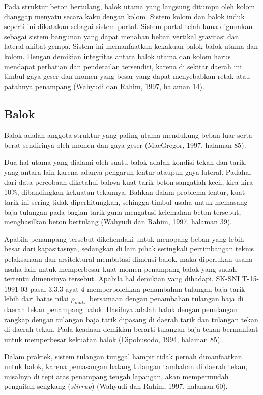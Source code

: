 Pada struktur beton bertulang, balok utama yang langsung ditumpu oleh
kolom dianggap menyatu secara kaku dengan kolom. Sistem kolom dan balok
induk seperti ini dikatakan sebagai sistem portal. Sistem portal telah
lama digunakan sebagai sistem bangunan yang dapat menahan beban vertikal
gravitasi dan lateral akibat gempa. Sistem ini memanfaatkan kekakuan
balok-balok utama dan kolom. Dengan demikian integritas antara balok utama
dan kolom harus mendapat perhatian dan pendetailan tersendiri, karena di
sekitar daerah ini timbul gaya geser dan momen yang besar yang dapat
menyebabkan retak atau patahnya penampang (Wahyudi dan Rahim, 1997,
halaman 14).

\subsection{Balok}

Balok adalah anggota struktur yang paling utama mendukung beban luar serta
berat sendirinya oleh momen dan gaya geser (MacGregor, 1997, halaman 85).

Dua hal utama yang dialami oleh suatu balok adalah kondisi tekan dan
tarik, yang antara lain karena adanya pengaruh lentur ataupun gaya
lateral. Padahal dari data percobaan diketahui bahwa kuat tarik beton
sangatlah kecil, kira-kira 10\%, dibandingkan kekuatan tekannya. Bahkan
dalam problema lentur, kuat tarik ini sering tidak diperhitungkan, sehingga
timbul usaha untuk memasang baja tulangan pada bagian tarik guna mengatasi
kelemahan beton tersebut, menghasilkan beton bertulang (Wahyudi dan Rahim,
1997, halaman 39).

Apabila penampang tersebut dikehendaki untuk menopang beban yang lebih
besar dari kapasitasnya, sedangkan di lain pihak seringkali pertimbangan
teknis pelaksanaan dan arsitektural membatasi dimensi balok, maka
diperlukan usaha-usaha lain untuk memperbesar kuat momen penampang balok
yang sudah tertentu dimensinya tersebut. Apabila hal demikian yang
dihadapi, SK-SNI T-15-1991-03 pasal 3.3.3 ayat 4 memperbolehkan penambahan
tulangan baja tarik lebih dari batas nilai $\rho_{maks}$ bersamaan dengan
penambahan tulangan baja di daerah tekan penampang balok. Hasilnya adalah
balok dengan penulangan rangkap dengan tulangan baja tarik dipasang di
daerah tarik dan tulangan tekan di daerah tekan. Pada keadaan demikian
berarti tulangan baja tekan bermanfaat untuk memperbesar kekuatan balok
(Dipohusodo, 1994, halaman 85).

Dalam praktek, sistem tulangan tunggal hampir tidak pernah dimanfaatkan
untuk balok, karena pemasangan batang tulangan tambahan di daerah tekan,
misalnya di tepi atas penampang tengah lapangan, akan mempermudah
pengaitan sengkang (\textit{stirrup}) (Wahyudi dan Rahim, 1997, halaman
60).

